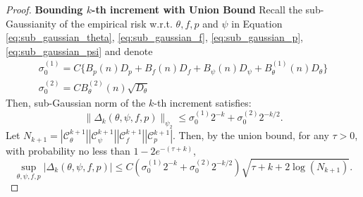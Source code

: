 \documentclass[12pt]{article}
\newcommand{\pr}{\mathbb{P}}
\begin{document}
\begin{proof}
\noindent\textbf{Bounding $k$-th increment with Union Bound} Recall the sub-Gaussianity of the empirical risk w.r.t. $\theta,f,p$ and $\psi$ in Equation \eqref{eq:sub_gaussian_theta}, \eqref{eq:sub_gaussian_f}, \eqref{eq:sub_gaussian_p}, \eqref{eq:sub_gaussian_psi} and denote 
\begin{gather*}
    \sigma_0^{(1)} = C\{B_p(n) D_{p} + B_f(n)D_{f}+ B_\psi(n)D_{\psi}+ B_\theta^{(1)}(n)D_\theta\}\\
    \sigma_0^{(2)} = CB_\theta^{(2)}(n)\sqrt{D_\theta}
\end{gather*}
Then, sub-Gaussian norm of the $k$-th increment satisfies:
$$\|\Delta_k(\theta,\psi,f,p)\|_{\psi_2}\leq \sigma_0^{(1)}2^{-k} + \sigma_0^{(2)}2^{-k/2}.$$
Let  $N_{k+1} = |\mathcal{C}^{k+1}_\theta||\mathcal{C}^{k+1}_\psi||\mathcal{C}^{k+1}_f||\mathcal{C}^{k+1}_p|$. Then, by the union bound, 
for any $\tau>0$, with probability no less than $1-2e^{-(\tau+k)}$, 
\begin{equation}\label{eq:k_increment}
  \sup_{\theta,\psi,f,p}|\Delta_k(\theta,\psi,f,p)|\leq C(\sigma_0^{(1)}2^{-k} + \sigma_0^{(2)}2^{-k/2})\sqrt{\tau + k +2\log(N_{k+1})}.  
\end{equation}


\end{proof}
\end{document}
